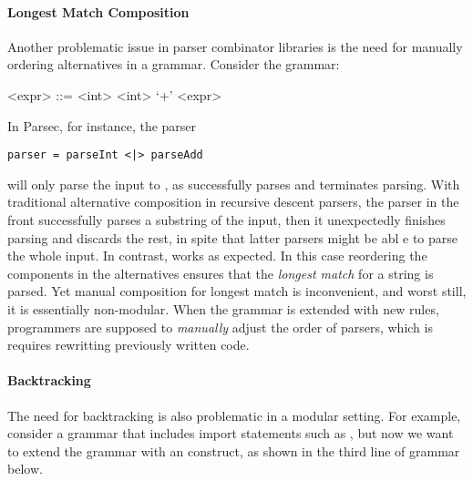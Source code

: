 \paragraph{Longest Match Composition} Another problematic issue
in parser combinator libraries is the need for manually ordering
alternatives in a grammar.
Consider the grammar:
\setlength{\grammarindent}{5em}
\begin{grammar}
<expr> ::= <int> \alt <int> `+' <expr>
\end{grammar}
In Parsec, for instance, the parser
\begin{lstlisting}[language=PlainCode]
parser = parseInt <|> parseAdd
\end{lstlisting}
will only parse the input  to , as  successfully parses 
and terminates parsing. With traditional alternative
composition in recursive descent parsers, the parser in the front successfully parses a substring of the input, then it unexpectedly
finishes parsing and discards the rest, in spite that latter parsers might be abl e to parse the whole input.
In contrast,  works as expected.
In this case reordering the components in the alternatives ensures that
the \emph{longest match} for a string is parsed. Yet manual composition for longest match is inconvenient, and worst still, it is essentially non-modular. When the grammar is extended with new rules, programmers are supposed to \emph{manually} adjust
the order of parsers, which is requires rewritting previously written code.

\paragraph{Backtracking} The need for backtracking is also problematic
in a modular setting. For example, consider a grammar that includes
import statements such as ,
but now we want to extend the grammar with an  construct, as shown in the third line of grammar below.

